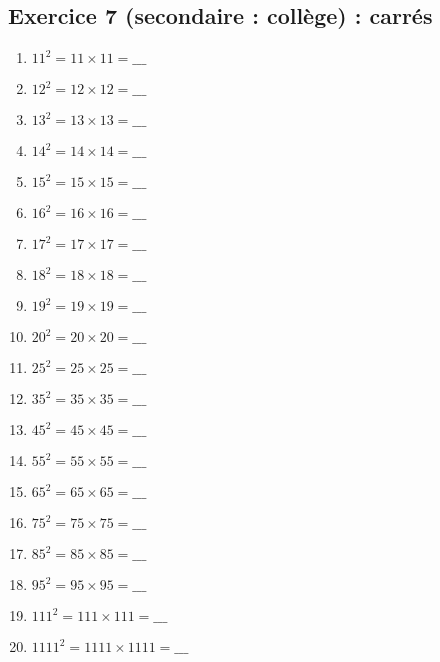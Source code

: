 \subsection{Exercice 7 (secondaire : collège) : carrés}


\label{calc:niveau7}

\begin{enumerate}[label=C\arabic*)]
    \item \(11^2 = 11 \times 11 =  \_\_\_\)
    \item \(12^2 = 12 \times 12 = \_\_\_\)
    \item \(13^2 = 13 \times 13 = \_\_\_\)
    \item \(14^2 = 14 \times 14 = \_\_\_\)
    \item \(15^2 = 15 \times 15 = \_\_\_\)
    \item \(16^2 = 16 \times 16 = \_\_\_\)
    \item \(17^2 = 17 \times 17 = \_\_\_\)
    \item \(18^2 = 18 \times 18 = \_\_\_\)
    \item \(19^2 = 19 \times 19 = \_\_\_\)
    \item \(20^2 = 20 \times 20 = \_\_\_\)
    \item \(25^2 = 25 \times 25 =  \_\_\_\)
    \item \(35^2 = 35 \times 35 = \_\_\_\)
    \item \(45^2 = 45 \times 45 = \_\_\_\)
    \item \(55^2 = 55 \times 55 = \_\_\_\)
    \item \(65^2 = 65 \times 65 = \_\_\_\)
    \item \(75^2 = 75 \times 75 = \_\_\_\)
    \item \(85^2 = 85 \times 85 = \_\_\_\)
    \item \(95^2 = 95 \times 95 = \_\_\_\)
    \item \(111^2 = 111 \times 111 = \_\_\_\)
    \item \(1111^2 = 1111 \times 1111 = \_\_\_\)
\end{enumerate}


